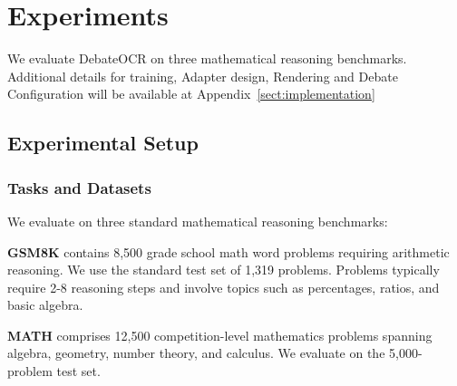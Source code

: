 \documentclass{article}
\theoremstyle{plain}
\theoremstyle{definition}
\theoremstyle{remark}
\begin{document}



\section{Experiments}
\label{sec:experiments}
We evaluate DebateOCR on three mathematical reasoning benchmarks. Additional details for training, Adapter design, Rendering and Debate Configuration will be available at Appendix~\ref{sect:implementation}

\subsection{Experimental Setup}
\label{subsec:exp_setup}

\subsubsection{Tasks and Datasets}
\label{subsubsec:tasks_datasets}
We evaluate on three standard mathematical reasoning benchmarks:

\textbf{GSM8K} \cite{cobbe2021training} contains 8,500 grade school math word problems 
requiring arithmetic reasoning. We use the standard test set of 1,319 problems. Problems 
typically require 2-8 reasoning steps and involve topics such as percentages, ratios, 
and basic algebra.

\textbf{MATH} \cite{hendrycks2021measuring} comprises 12,500 competition-level mathematics 
problems spanning algebra, geometry, number theory, and calculus. We evaluate on the 
5,000-problem test set. 

\end{document}
